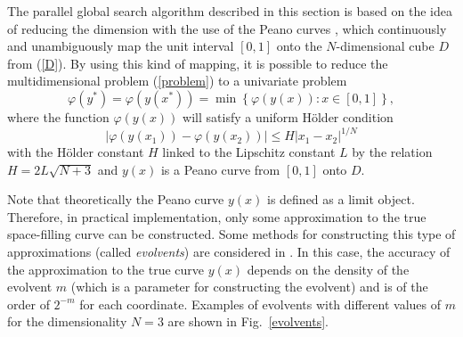 \documentclass{svproc}
\begin{document}
The parallel global search algorithm described in this section is based on the idea of reducing the dimension with the use of the Peano curves \cite{Sergeyev2013,Strongin2000}, which continuously and unambiguously map the unit interval $[0,1]$ onto the $N$-dimensional cube $D$ from (\ref{D}). By using this kind of mapping, it is possible to reduce the multidimensional problem (\ref{problem}) to a univariate problem
\[
\varphi(y^\ast)=\varphi(y(x^\ast))=\min{\left\{\varphi(y(x)): x\in[0,1]\right\}},
\]
where the function $\varphi(y(x))$ will satisfy a uniform H{\"o}lder condition
\[
\left|\varphi(y(x_1))-\varphi(y(x_2))\right|\leq H\left|x_1-x_2\right|^{1/N}
\]
with the H{\"o}lder constant $H$ linked to the Lipschitz constant $L$ by the relation
$ H=2 L \sqrt{N+3}$ and $y(x)$ is a Peano curve from $[0,1]$ onto $D$.

Note that theoretically the Peano curve $y(x)$ is defined as a limit object. Therefore, in practical implementation, only some approximation to the true space-filling curve can be constructed. Some methods for constructing this type of approximations (called \textit{evolvents}) are considered in \cite{Sergeyev2013,Strongin2000}. In this case, the accuracy of the approximation to the true curve $y(x)$ depends on the density of the evolvent $m$ (which is a parameter for constructing the evolvent) and is of the order of $2^{-m}$ for each coordinate.
Examples of evolvents with different values of $m$  for the dimensionality $N=3$ are shown in Fig.~\ref{evolvents}.
\end{document}
